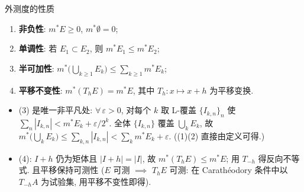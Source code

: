 \begin{frame}{外测度的性质}

\begin{thm}[外测度的性质]
\begin{enumerate}
\item \textbf{非负性}: $m^* E \geqslant 0$, $m^* \emptyset = 0$;
\item \textbf{单调性}: 若 $E_1 \subset E_2$, 则 $m^* E_1 \leqslant m^* E_2$;
\item \textbf{半可加性}: $m^*\Big(\bigcup_{k \geqslant 1} E_k\Big) \leqslant \sum_{k \geqslant 1} m^* E_k$;
\item \textbf{平移不变性}: $m^*(T_h E) = m^* E$, 其中 $T_h: x \mapsto x + h$ 为平移变换.
\end{enumerate}
\end{thm}

\pause

\begin{remark}[(3) 与 (4) 的证明]
\begin{itemize}
\item (3) 是唯一非平凡处: $\forall\, \varepsilon > 0$, 对每个 $k$ 取 L-覆盖 $\{I_{k,n}\}_{n}$ 使 $\sum_n |I_{k,n}| < m^* E_k + \varepsilon/2^k$. 全体 $\{I_{k,n}\}$ 覆盖 $\bigcup_k E_k$, 故 $m^*\big(\bigcup_k E_k\big) \leqslant \sum_{k,n} |I_{k,n}| < \sum_k m^* E_k + \varepsilon$. ((1)(2) 直接由定义可得.)
\item (4): $I + h$ 仍为矩体且 $|I + h| = |I|$, 故 $m^*(T_h E) \leqslant m^* E$; 用 $T_{-h}$ 得反向不等式. 且平移\alert{保持可测性} ($E$ 可测 $\implies$ $T_h E$ 可测: 在 Carath\'{e}odory 条件中以 $T_{-h} A$ 为试验集, 用平移不变性即得).
\end{itemize}
\end{remark}

\end{frame}


